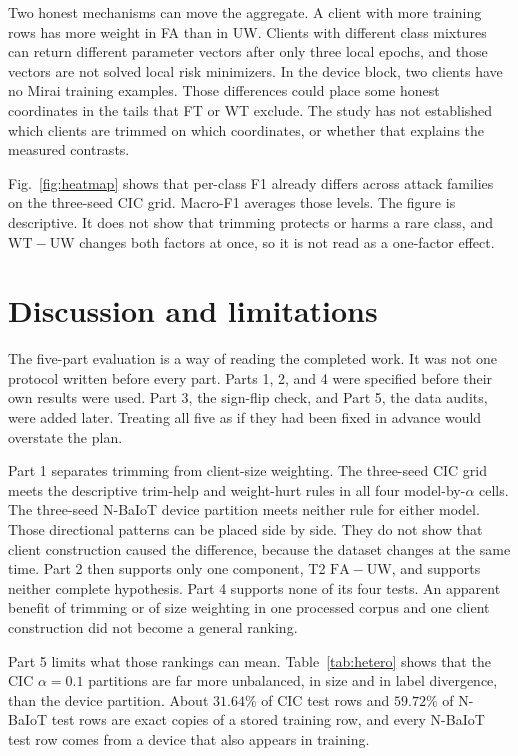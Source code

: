 \documentclass{ieeeaccess}
\begin{document}
Two honest mechanisms can move the aggregate. A client with more training rows has more weight in FA than in UW. Clients with different class mixtures can return different parameter vectors after only three local epochs, and those vectors are not solved local risk minimizers. In the device block, two clients have no Mirai training examples. Those differences could place some honest coordinates in the tails that FT or WT exclude. The study has not established which clients are trimmed on which coordinates, or whether that explains the measured contrasts.

Fig.~\ref{fig:heatmap} shows that per-class F1 already differs across attack families on the three-seed CIC grid. Macro-F1 averages those levels. The figure is descriptive. It does not show that trimming protects or harms a rare class, and $\mathrm{WT}-\mathrm{UW}$ changes both factors at once, so it is not read as a one-factor effect.

\section{Discussion and limitations}
The five-part evaluation is a way of reading the completed work. It was not one protocol written before every part. Parts 1, 2, and 4 were specified before their own results were used. Part 3, the sign-flip check, and Part 5, the data audits, were added later. Treating all five as if they had been fixed in advance would overstate the plan.

Part 1 separates trimming from client-size weighting. The three-seed CIC grid meets the descriptive trim-help and weight-hurt rules in all four model-by-$\alpha$ cells. The three-seed N-BaIoT device partition meets neither rule for either model. Those directional patterns can be placed side by side. They do not show that client construction caused the difference, because the dataset changes at the same time. Part 2 then supports only one component, T2 $\mathrm{FA}-\mathrm{UW}$, and supports neither complete hypothesis. Part 4 supports none of its four tests. An apparent benefit of trimming or of size weighting in one processed corpus and one client construction did not become a general ranking.

Part 5 limits what those rankings can mean. Table~\ref{tab:hetero} shows that the CIC $\alpha=0.1$ partitions are far more unbalanced, in size and in label divergence, than the device partition. About $31.64\%$ of CIC test rows and $59.72\%$ of N-BaIoT test rows are exact copies of a stored training row, and every N-BaIoT test row comes from a device that also appears in training.
\end{document}
